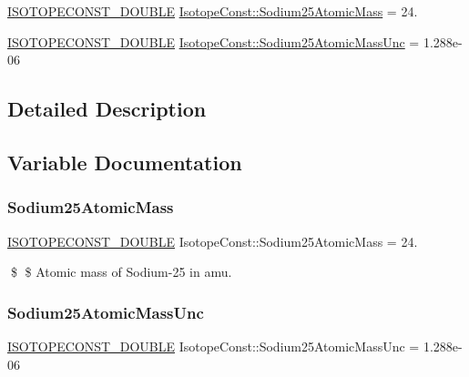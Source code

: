 \begin{DoxyCompactItemize}
\item 
\mbox{\hyperlink{group___isotope_const-_macros_ga8f45a7272ce02c0b4c65c44636ed719a}{I\+S\+O\+T\+O\+P\+E\+C\+O\+N\+S\+T\+\_\+\+D\+O\+U\+B\+LE}} \mbox{\hyperlink{group___isotope_const-_sodium-_na25_ga0642e1b586d2d8119e0d26c5a9a017a8}{Isotope\+Const\+::\+Sodium25\+Atomic\+Mass}} = 24.
\item 
\mbox{\hyperlink{group___isotope_const-_macros_ga8f45a7272ce02c0b4c65c44636ed719a}{I\+S\+O\+T\+O\+P\+E\+C\+O\+N\+S\+T\+\_\+\+D\+O\+U\+B\+LE}} \mbox{\hyperlink{group___isotope_const-_sodium-_na25_ga0496a1e779a3abd99504dc529b82f756}{Isotope\+Const\+::\+Sodium25\+Atomic\+Mass\+Unc}} = 1.\+288e-\/06
\end{DoxyCompactItemize}


\subsection{Detailed Description}


\subsection{Variable Documentation}
\mbox{\label{group___isotope_const-_sodium-_na25_ga0642e1b586d2d8119e0d26c5a9a017a8}} 
\subsubsection{\texorpdfstring{Sodium25\+Atomic\+Mass}{Sodium25AtomicMass}}
{\footnotesize\ttfamily \mbox{\hyperlink{group___isotope_const-_macros_ga8f45a7272ce02c0b4c65c44636ed719a}{I\+S\+O\+T\+O\+P\+E\+C\+O\+N\+S\+T\+\_\+\+D\+O\+U\+B\+LE}} Isotope\+Const\+::\+Sodium25\+Atomic\+Mass = 24.}

\$ \$ Atomic mass of Sodium-\/25 in amu. \mbox{\label{group___isotope_const-_sodium-_na25_ga0496a1e779a3abd99504dc529b82f756}} 
\subsubsection{\texorpdfstring{Sodium25\+Atomic\+Mass\+Unc}{Sodium25AtomicMassUnc}}
{\footnotesize\ttfamily \mbox{\hyperlink{group___isotope_const-_macros_ga8f45a7272ce02c0b4c65c44636ed719a}{I\+S\+O\+T\+O\+P\+E\+C\+O\+N\+S\+T\+\_\+\+D\+O\+U\+B\+LE}} Isotope\+Const\+::\+Sodium25\+Atomic\+Mass\+Unc = 1.\+288e-\/06}

